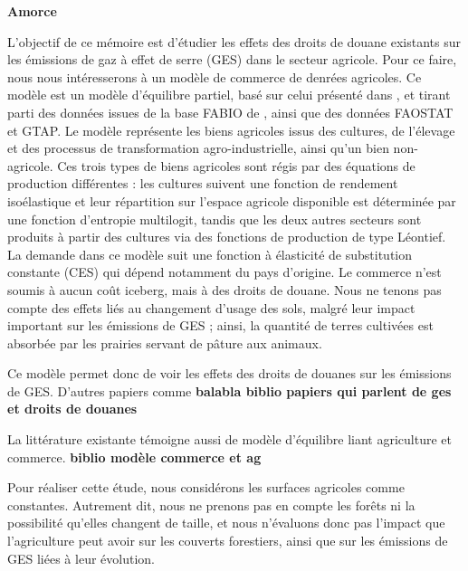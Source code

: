 \textbf{Amorce}

L'objectif de ce mémoire est d'étudier les effets des droits de douane existants sur les émissions de gaz à effet de serre (GES) dans le secteur agricole. Pour ce faire, nous nous intéresserons à un modèle de commerce de denrées agricoles. Ce modèle est un modèle d'équilibre partiel, basé sur celui présenté dans \cite{Gouel2021}, et tirant parti des données issues de la base FABIO de \cite{Bruckner2019}, ainsi que des données FAOSTAT et GTAP. Le modèle représente les biens agricoles issus des cultures, de l'élevage et des processus de transformation agro-industrielle, ainsi qu'un bien non-agricole. Ces trois types de biens agricoles sont régis par des équations de production différentes : les cultures suivent une fonction de rendement isoélastique et leur répartition sur l'espace agricole disponible est déterminée par une fonction d'entropie multilogit, tandis que les deux autres secteurs sont produits à partir des cultures via des fonctions de production de type Léontief. La demande dans ce modèle suit une fonction à élasticité de substitution constante (CES) qui dépend notamment du pays d'origine. Le commerce n'est soumis à aucun coût iceberg, mais à des droits de douane. Nous ne tenons pas compte des effets liés au changement d'usage des sols, malgré leur impact important sur les émissions de GES ; ainsi, la quantité de terres cultivées est absorbée par les prairies servant de pâture aux animaux.

Ce modèle permet donc de voir les effets des droits de douanes sur les émissions de GES. D'autres papiers comme \textbf{balabla biblio papiers qui parlent de ges et droits de douanes}

La littérature existante témoigne aussi de modèle d'équilibre liant agriculture et commerce. \textbf{biblio modèle commerce et ag}




Pour réaliser cette étude, nous considérons les surfaces agricoles comme constantes. Autrement dit, nous ne prenons pas en compte les forêts ni la possibilité qu'elles changent de taille, et nous n'évaluons donc pas l’impact que l’agriculture peut avoir sur les couverts forestiers, ainsi que sur les émissions de GES liées à leur évolution.

